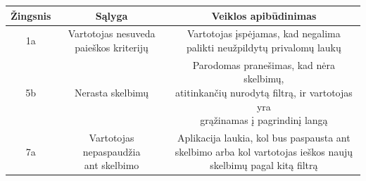\documentclass[12pt]{article}
\begin{document}
\begin{enumerate}
		\begin{center}
		\begin{tabular}{ | c | c | c | }
			\hline
			Žingsnis & Sąlyga                                     & Veiklos apibūdinimas \\ \hline
			1a       & \makecell{Vartotojas nesuveda \\ paieškos kriterijų} & \makecell{Vartotojas įspėjamas, kad negalima \\ palikti neužpildytų privalomų laukų} \\ \hline
			5b       & Nerasta skelbimų                           & \makecell{Parodomas pranešimas, kad nėra skelbimų, \\ atitinkančių nurodytą filtrą, ir vartotojas yra \\ grąžinamas į pagrindinį langą } \\ \hline
			7a       & \makecell{Vartotojas nepaspaudžia \\ ant skelbimo} & \makecell{Aplikacija laukia, kol bus paspausta ant \\ skelbimo arba kol vartotojas ieškos naujų \\  skelbimų pagal kitą filtrą} \\ \hline
		\end{tabular}
		\end{center}		
		
	\end{enumerate}	
	
\end{document}
